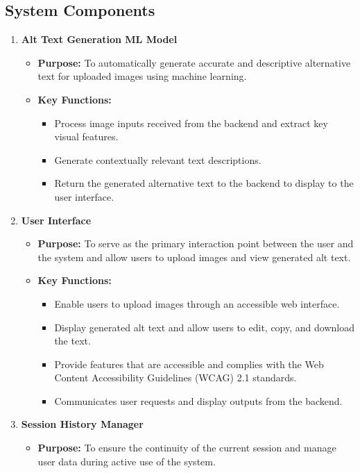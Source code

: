 \documentclass{article}
\begin{document}
\subsection{System Components}
\begin{enumerate}
    \item \textbf{Alt Text Generation ML Model}
    \begin{itemize}
        \item \textbf{Purpose:} To automatically generate accurate and descriptive alternative text for uploaded images using machine learning.
        \item \textbf{Key Functions:}
        \begin{itemize}
            \item Process image inputs received from the backend and extract key visual features.
            \item Generate contextually relevant text descriptions.
            \item Return the generated alternative text to the backend to display to the user interface.
        \end{itemize}
    \end{itemize}
    \item \textbf{User Interface}
    \begin{itemize}
        \item \textbf{Purpose:} To serve as the primary interaction point between the user and the system and allow users to upload images and view generated alt text.
        \item \textbf{Key Functions:}
        \begin{itemize}
            \item Enable users to upload images through an accessible web interface.
            \item Display generated alt text and allow users to edit, copy, and download the text. 
            \item Provide features that are accessible and complies with the Web Content Accessibility Guidelines (WCAG) 2.1 standards.
            \item Communicates user requests and display outputs from the backend.
        \end{itemize}
    \end{itemize}
    \item \textbf{Session History Manager}
    \begin{itemize}
        \item \textbf{Purpose:} To ensure the continuity of the current session and manage user data during active use of the system.

\end{itemize}
\end{enumerate}
\end{document}
